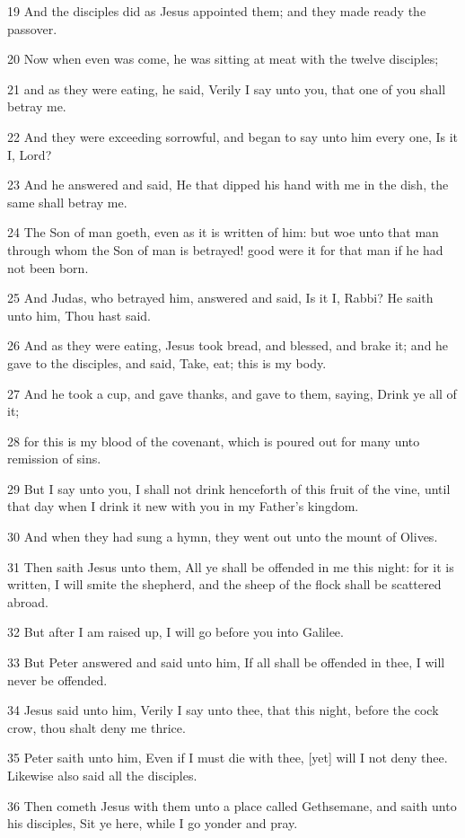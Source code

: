 \par 19 And the disciples did as Jesus appointed them; and they made ready the passover.
\par 20 Now when even was come, he was sitting at meat with the twelve disciples;
\par 21 and as they were eating, he said, Verily I say unto you, that one of you shall betray me.
\par 22 And they were exceeding sorrowful, and began to say unto him every one, Is it I, Lord?
\par 23 And he answered and said, He that dipped his hand with me in the dish, the same shall betray me.
\par 24 The Son of man goeth, even as it is written of him: but woe unto that man through whom the Son of man is betrayed! good were it for that man if he had not been born.
\par 25 And Judas, who betrayed him, answered and said, Is it I, Rabbi? He saith unto him, Thou hast said.
\par 26 And as they were eating, Jesus took bread, and blessed, and brake it; and he gave to the disciples, and said, Take, eat; this is my body.
\par 27 And he took a cup, and gave thanks, and gave to them, saying, Drink ye all of it;
\par 28 for this is my blood of the covenant, which is poured out for many unto remission of sins.
\par 29 But I say unto you, I shall not drink henceforth of this fruit of the vine, until that day when I drink it new with you in my Father's kingdom.
\par 30 And when they had sung a hymn, they went out unto the mount of Olives.
\par 31 Then saith Jesus unto them, All ye shall be offended in me this night: for it is written, I will smite the shepherd, and the sheep of the flock shall be scattered abroad.
\par 32 But after I am raised up, I will go before you into Galilee.
\par 33 But Peter answered and said unto him, If all shall be offended in thee, I will never be offended.
\par 34 Jesus said unto him, Verily I say unto thee, that this night, before the cock crow, thou shalt deny me thrice.
\par 35 Peter saith unto him, Even if I must die with thee, [yet] will I not deny thee. Likewise also said all the disciples.
\par 36 Then cometh Jesus with them unto a place called Gethsemane, and saith unto his disciples, Sit ye here, while I go yonder and pray.

